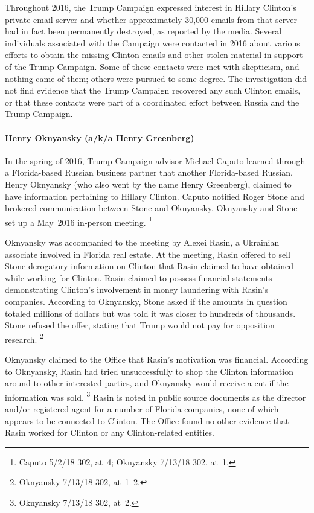 Throughout 2016, the Trump Campaign expressed interest in Hillary Clinton's private email server and whether approximately 30,000 emails from that server had in fact been permanently destroyed, as reported by the media.
Several individuals associated with the Campaign were contacted in 2016 about various efforts to obtain the missing Clinton emails and other stolen material in support of the Trump Campaign.
Some of these contacts were met with skepticism, and nothing came of them; others were pursued to some degree.
The investigation did not find evidence that the Trump Campaign recovered any such Clinton emails, or that these contacts were part of a coordinated effort between Russia and the Trump Campaign.

\paragraph{Henry Oknyansky (a/k/a Henry Greenberg)}

In the spring of 2016, Trump Campaign advisor Michael Caputo learned through a Florida-based Russian business partner that another Florida-based Russian, Henry Oknyansky (who also went by the name Henry Greenberg), claimed to have information pertaining to Hillary Clinton.
Caputo notified Roger Stone and brokered communication between Stone and Oknyansky.
Oknyansky and Stone set up a May~2016 in-person meeting.%
\footnote{Caputo 5/2/18 302, at~4;
Oknyansky 7/13/18 302, at~1.}

Oknyansky was accompanied to the meeting by Alexei Rasin, a Ukrainian associate involved in Florida real estate.
At the meeting, Rasin offered to sell Stone derogatory information on Clinton that Rasin claimed to have obtained while working for Clinton.
Rasin claimed to possess financial statements demonstrating Clinton's involvement in money laundering with Rasin's companies.
According to Oknyansky, Stone asked if the amounts in question totaled millions of dollars but was told it was closer to hundreds of thousands.
Stone refused the offer, stating that Trump would not pay for opposition research.%
\footnote{Oknyansky 7/13/18 302, at~1--2.}

Oknyansky claimed to the Office that Rasin's motivation was financial.
According to Oknyansky, Rasin had tried unsuccessfully to shop the Clinton information around to other interested parties, and Oknyansky would receive a cut if the information was sold.%
\footnote{Oknyansky 7/13/18 302, at~2.}
Rasin is noted in public source documents as the director and/or registered agent for a number of Florida companies, none of which appears to be connected to Clinton.
The Office found no other evidence that Rasin worked for Clinton or any Clinton-related entities.

